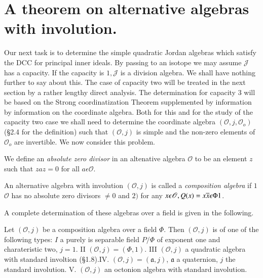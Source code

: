 \section{A theorem on alternative algebras with involution.}\label{c3:sec8}

Our next task is to determine the simple quadratic Jordan algebras
which satisfy the DCC for principal inner ideals. By passing to an
isotope we may assume $\mathscr{J}$ has a capacity. If the capacity is
$1,\mathscr{J}$ is a division algebra. We shall have nothing further
to say about this. The case of capacity two will be treated in the
next section by a rather lengthy direct analysis. The determination
for capacity $3$ will be based on  the Strong coordinatization Theorem
supplemented by information by information on the coordinate
algebra. Both for this and for the study of the capacity two case we
shall need to determine the coordinate algebra $(\mathscr{O},
j,\mathscr{O}_o)$ (\S 2.4 for the definition) such that\pageoriginale
$(\mathscr{O},j)$ is simple and the non-zero elements of
$\mathscr{O}_o$ are invertible. We now consider this problem.

We define an {\em absolute zero divisor} in an altenative algebra
$\mathscr{O}$ to be an element $z$ such that $zaz=0$ for all
$a\epsilon \mathscr{O}$.

\begin{defn}\label{c3:defn5}
An alternative algebra with involution $(\mathscr{O},j)$ is called a
{\em composition algebra} if $1$ $\mathscr{O}$ has no absolute zero
divisors $\neq 0$ and $2)$ for any $x\epsilon
\mathscr{O},Q(x)=x\overline{x}\epsilon \Phi 1$.

A complete determination of these algebras over a field is given in
the following.
\end{defn}

\begin{thm}\label{c3:thm8}
  Let $(\mathscr{O},j)$ be a composition algebra over a field
  $\Phi$. Then $(\mathscr{O},j)$ is of one of the following types: $I$ a
  purely is separable field $P/\Phi$ of exponent one and charateristic
  two, $j=1$. II $(\mathscr{O},j)=(\Phi,1)$. III $(\mathscr{O},j)$ a
  quadratic algebra with standard involtion
  (\S1.8).IV. $(\mathscr{O},j)=(\mathfrak{a},j)$, $\mathfrak{a}$ a
  quaternion, $j$ the standard involution. V. $(\mathscr{O},j)$ an
  octonion algebra with standard involution.
\end{thm}

